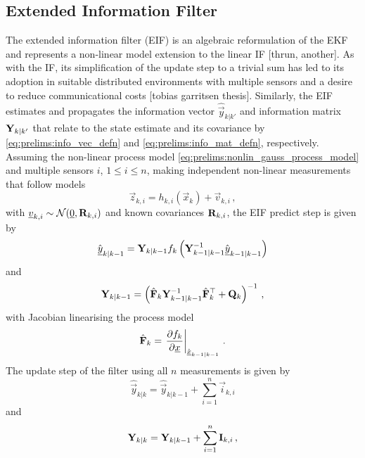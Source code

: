 \subsection{Extended Information Filter}\label{subsec:prelims:eif}
The extended information filter (EIF) is an algebraic reformulation of the EKF and represents a non-linear model extension to the linear IF [thrun, another]. As with the IF, its simplification of the update step to a trivial sum has led to its adoption in suitable distributed environments with multiple sensors and a desire to reduce communicational costs [tobias garritsen thesis]. Similarly, the EIF estimates and propagates the information vector $\hat{\vec{y}}_{k|k'}$ and information matrix ${{\mathbf{Y}}}_{k|k'}$ that relate to the state estimate and its covariance by \eqref{eq:prelims:info_vec_defn} and \eqref{eq:prelims:info_mat_defn}, respectively. Assuming the non-linear process model \eqref{eq:prelims:nonlin_gauss_process_model} and multiple sensors $i$, $1\leq i \leq n$, making independent non-linear measurements that follow models
\begin{equation}
    \vec{z}_{k,i} = h_{k,i}\left(\vec{x}_k\right) + \vec{v}_{k,i}\,,
\end{equation}
with ${\underline{v}}_{k,i}\sim\mathcal{N}({\underline{0}},{{\mathbf{R}}}_{k,i})$ and known covariances ${{\mathbf{R}}}_{k,i}$, the EIF predict step is given by
\begin{equation}\label{eq:prelims:eif_info_vec_predict}
    \hat{{\underline{y}}}_{k|k-1} = {{\mathbf{Y}}}_{k|k-1}f_k\left({{\mathbf{Y}}}_{k-1|k-1}^{-1}\hat{{\underline{y}}}_{k-1|k-1}\right)
\end{equation}
and
\begin{equation}\label{eq:prelims:eif_info_mat_predict}
    {\ensuremath{{\mathbf{Y}}}}_{k|k-1} = \left(\hat{{{\mathbf{F}}}}_k{{\mathbf{Y}}}_{k-1|k-1}^{-1}\hat{{{\mathbf{F}}}}_k^\top + {{\mathbf{Q}}}_k\right)^{-1}\,,
\end{equation}
with Jacobian linearising the process model
\begin{equation}
    \hat{{{\mathbf{F}}}}_k = \left.\frac{\partial f_k}{\partial {\underline{x}}}\right|_{\hat{{\underline{x}}}_{k-1|k-1}}\,.
\end{equation}
The update step of the filter using all $n$ measurements is given by
\begin{equation}\label{eq:prelims:eif_info_vec_update}
    \hat{\vec{y}}_{k|k} = \hat{\vec{y}}_{k|k-1} + \sum_{i=1}^n\vec{i}_{k,i}
\end{equation}
and
\begin{equation}\label{eq:prelims:eif_info_mat_update}
    {\ensuremath{{\mathbf{Y}}}}_{k|k} = {{\mathbf{Y}}}_{k|k-1} + \sum_{i=1}^n{{\mathbf{I}}}_{k,i}\,,
\end{equation}
